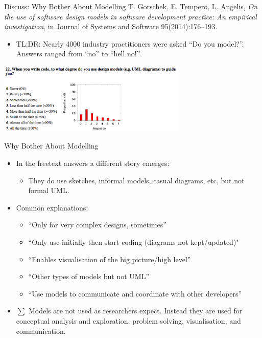 \documentclass[10pt,t,a4paper]{beamer}
\begin{document}
\begin{frame}[label=sec-7]{Discuss: Why Bother About Modelling}
T. Gorschek, E. Tempero, L. Angelis, \emph{On the use of software design models in software development practice: An empirical investigation}, in Journal of Systems and Software 95(2014):176--193.

\begin{itemize}
\item TL;DR: Nearly 4000 industry practitioners were asked ``Do you model?''. Answers ranged from ``no'' to ``hell no!''.
\end{itemize}
 \vspace{0.25cm}
\includegraphics[width=9cm]{./FSurveyModelling.png}
\end{frame}
\begin{frame}[label=sec-8]{Why Bother About Modelling}
\begin{itemize}
\item In the freetext answers a different story emerges:
\begin{itemize}
\item They do use sketches, informal models, casual diagrams, etc, but not formal UML.
\end{itemize}
\item Common explanations:
\begin{itemize}
\item ``Only for very complex designs, sometimes''
\item ``Only use initially then start coding (diagrams not kept/updated)"
\item ``Enables visualisation of the big picture/high level''
\item ``Other types of models but not UML''
\item ``Use models to communicate and coordinate with other developers''
\end{itemize}
\item $\sum$ Models are not used as researchers expect. Instead they are used for \alert{conceptual analysis and exploration, problem solving, visualisation, and communication.}
\end{itemize}
\end{frame}
\end{document}

